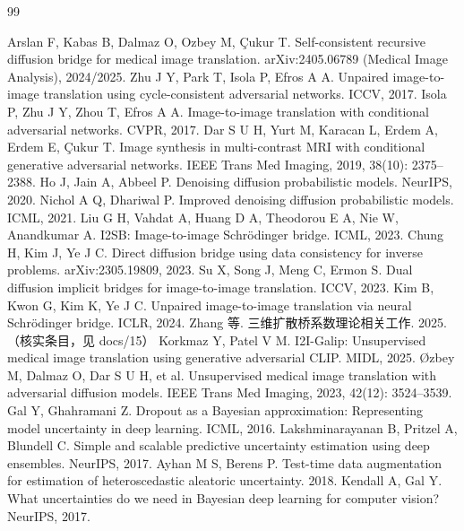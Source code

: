 \documentclass[11pt,a4paper]{ctexart}
\begin{document}
\begin{thebibliography}{99}\small

 Arslan F, Kabas B, Dalmaz O, Ozbey M, {\c C}ukur T. Self-consistent recursive diffusion bridge for medical image translation. arXiv:2405.06789 (Medical Image Analysis), 2024/2025.
 Zhu J Y, Park T, Isola P, Efros A A. Unpaired image-to-image translation using cycle-consistent adversarial networks. ICCV, 2017.
 Isola P, Zhu J Y, Zhou T, Efros A A. Image-to-image translation with conditional adversarial networks. CVPR, 2017.
 Dar S U H, Yurt M, Karacan L, Erdem A, Erdem E, {\c C}ukur T. Image synthesis in multi-contrast MRI with conditional generative adversarial networks. IEEE Trans Med Imaging, 2019, 38(10): 2375--2388.
 Ho J, Jain A, Abbeel P. Denoising diffusion probabilistic models. NeurIPS, 2020.
 Nichol A Q, Dhariwal P. Improved denoising diffusion probabilistic models. ICML, 2021.
 Liu G H, Vahdat A, Huang D A, Theodorou E A, Nie W, Anandkumar A. I2SB: Image-to-image Schr{\"o}dinger bridge. ICML, 2023.
 Chung H, Kim J, Ye J C. Direct diffusion bridge using data consistency for inverse problems. arXiv:2305.19809, 2023.
 Su X, Song J, Meng C, Ermon S. Dual diffusion implicit bridges for image-to-image translation. ICCV, 2023.
 Kim B, Kwon G, Kim K, Ye J C. Unpaired image-to-image translation via neural Schr{\"o}dinger bridge. ICLR, 2024.
 Zhang 等. 三维扩散桥系数理论相关工作. 2025.（核实条目，见 docs/15）
 Korkmaz Y, Patel V M. I2I-Galip: Unsupervised medical image translation using generative adversarial CLIP. MIDL, 2025.
 {\O}zbey M, Dalmaz O, Dar S U H, et al. Unsupervised medical image translation with adversarial diffusion models. IEEE Trans Med Imaging, 2023, 42(12): 3524--3539.
 Gal Y, Ghahramani Z. Dropout as a Bayesian approximation: Representing model uncertainty in deep learning. ICML, 2016.
 Lakshminarayanan B, Pritzel A, Blundell C. Simple and scalable predictive uncertainty estimation using deep ensembles. NeurIPS, 2017.
 Ayhan M S, Berens P. Test-time data augmentation for estimation of heteroscedastic aleatoric uncertainty. 2018.
 Kendall A, Gal Y. What uncertainties do we need in Bayesian deep learning for computer vision? NeurIPS, 2017.

\end{thebibliography}
\end{document}
